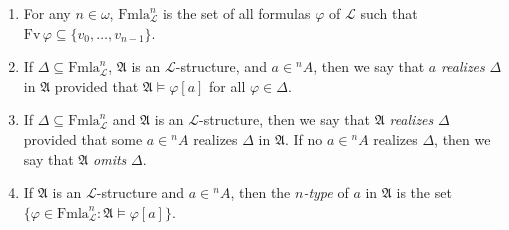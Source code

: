 \begin{enumerate}
\item[(i)] For any $n \in \omega$, $\mathrm{Fmla}^n_{\mathcal{L}}$ is the set of all formulas $\varphi$ of $\mathcal{L}$ such that $\mathrm{Fv}\,\varphi \subseteq \{v_0, \ldots, v_{n-1}\}$.
\item[(ii)] If $\Delta \subseteq \mathrm{Fmla}^n_{\mathcal{L}}$, $\mathfrak{A}$ is an $\mathcal{L}$-structure, and $a \in {}^n A$, then we say that $a$ \emph{realizes} $\Delta$ in $\mathfrak{A}$ provided that $\mathfrak{A} \models \varphi[a]$ for all $\varphi \in \Delta$.
\item[(iii)] If $\Delta \subseteq \mathrm{Fmla}^n_{\mathcal{L}}$ and $\mathfrak{A}$ is an $\mathcal{L}$-structure, then we say that $\mathfrak{A}$ \emph{realizes} $\Delta$ provided that some $a \in {}^n A$ realizes $\Delta$ in $\mathfrak{A}$. If no $a \in {}^n A$ realizes $\Delta$, then we say that $\mathfrak{A}$ \emph{omits} $\Delta$.
\item[(iv)] If $\mathfrak{A}$ is an $\mathcal{L}$-structure and $a \in {}^n A$, then the \emph{$n$-type} of $a$ in $\mathfrak{A}$ is the set $\{\varphi \in \mathrm{Fmla}^n_{\mathcal{L}} : \mathfrak{A} \models \varphi[a]\}$.
\end{enumerate}
